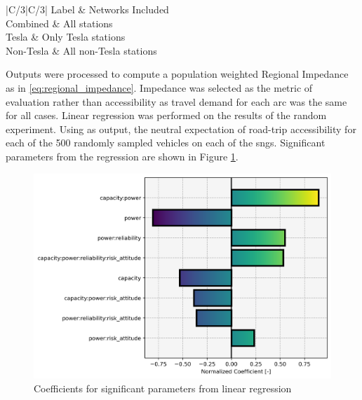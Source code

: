 \documentclass[11pt]{article}
\begin{document}
\begin{multicols}{2}
\begin{table}[H]
	\centering
	\caption{\glspl{sng} used in experiment.}
	\label{tab:experimental_sngs}
	\begin{tabular}{|C{\linewidth/3}|C{/3}|}
		\hline Label & Networks Included \\
		\hline Combined & All stations \\
		\hline Tesla & Only Tesla stations \\
		\hline Non-Tesla & All non-Tesla stations \\
		\hline
	\end{tabular}
\end{table}

Outputs were processed to compute a population weighted Regional Impedance as in \eqref{eq:regional_impedance}. Impedance was selected as the metric of evaluation rather than accessibility as travel demand for each arc was the same for all cases. Linear regression was performed on the results of the random experiment. Using as output, the neutral expectation of road-trip accessibility for each of the 500 randomly sampled vehicles on each of the \glspl{sng}. Significant parameters from the regression are shown in Figure \ref{fig:significant_parameters}.

\begin{figure}[H]
	\centering
	\includegraphics[width = \linewidth]{figs/significant_parameters.png}
	\caption{Coefficients for significant parameters from linear regression}
	\label{fig:significant_parameters}
\end{figure}


\end{multicols}
\end{document}
